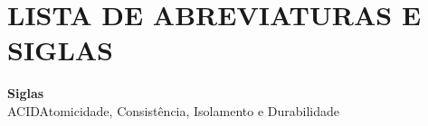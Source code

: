 \documentclass[
12pt,
a4paper,
semrecuonosumario,
sumario = abnt-6027-2012]{report}
\begin{document}
	\newpage
	\section*{\centering \small\bfseries LISTA DE ABREVIATURAS E SIGLAS}
	\textbf{Siglas}\\
	
	\noindent
	ACID\hspace{1cm}Atomicidade, Consistência, Isolamento e Durabilidade
	\clearpage
	
	\renewcommand{\cftdotsep}{1}
	
	\renewcommand{\contentsname}{\MakeUppercase{Sumário}}
	\renewcommand{\cfttoctitlefont}{\bfseries\small} %
	\renewcommand{\cftaftertoctitle}{\hfill\par}           %
	\renewcommand{\cftchapfont}{\bfseries}
	\renewcommand{\cftchappagefont}{\bfseries}
	
	\renewcommand{\cftsecfont}{\bfseries}
	\renewcommand{\cftsecpagefont}{\bfseries}
	
	\renewcommand{\cftsubsecfont}{\bfseries}
	\renewcommand{\cftsubsecpagefont}{\bfseries}
	
	\setlength{\cftbeforetoctitleskip}{0pt}
	\setlength{\cftaftertoctitleskip}{2ex}
	
	
	\setcounter{tocdepth}{2}
	\tableofcontents
	\newpage
	
	\titleformat{\chapter}{\bfseries\small}{\thechapter}{1em}{}
	\titlespacing*{\chapter}{0pt}{2.5ex}{1.5ex}
	\titleformat{\section}{\bfseries\small}{\thesection}{1em}{}
	\titlespacing*{\section}{0pt}{2.0ex}{1.0ex}
	
\end{document}
